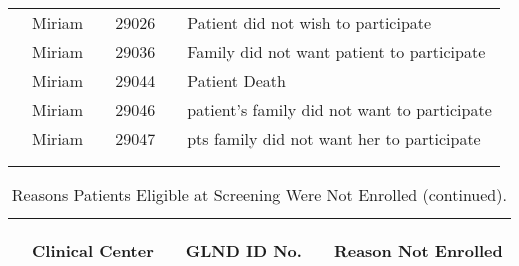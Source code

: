 \documentclass[dvips,10pt]{article}
\begin{document}
\begin{table}[t]
\begin{center}
\begin{tabular}{ @{}l@{}
@{}l@{}@{}p{1.5em}@{}@{}c@{}@{}p{1.5em}@{}@{}l@{}
}
& Miriam && 29026 && Patient did not wish to participate \\
& Miriam && 29036 && Family did not want patient to participate \\
& Miriam && 29044 && Patient Death \\
& Miriam && 29046 && patient's family did not want to participate \\
& Miriam && 29047 && pts family did not want her to participate \\
\\
\hline \\

\end{tabular}

\end{center}
 \end{table}
\begin{table}[t]
\caption
{ Reasons Patients Eligible at Screening Were Not Enrolled (continued). }
\begin{center}
\begin{tabular}{ @{}l@{}
@{}l@{}@{}p{1.5em}@{}@{}c@{}@{}p{1.5em}@{}@{}l@{}
}
\hline

& \parbox{6em}{\begin{center}Clinical Center\end{center}} && \parbox{6em}{\begin{center}GLND ID No.\end{center}} && \parbox{6em}{\begin{center}Reason Not Enrolled\end{center}} \\

\hline


\end{tabular}
\end{center}
\end{table}
\end{document}
